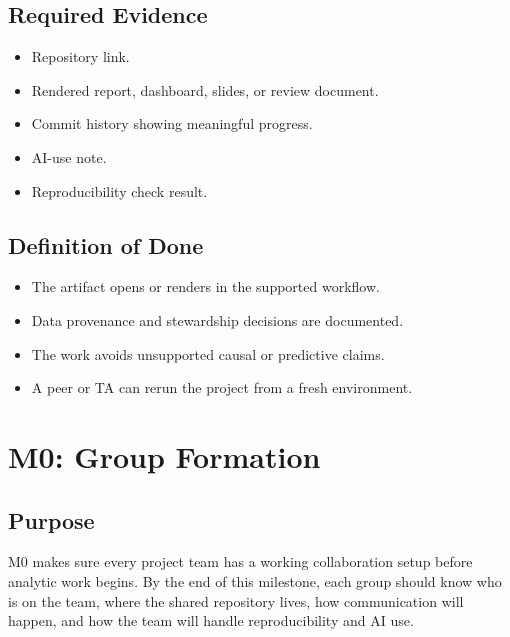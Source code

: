 \documentclass[
  letterpaper,
  DIV=11,
  numbers=noendperiod,
  oneside]{scrreprt}
\providecommand{\tightlist}{%
  \setlength{\itemsep}{0pt}\setlength{\parskip}{0pt}}
\begin{document}
\section*{Required Evidence}\label{required-evidence}


\begin{itemize}
\tightlist
\item
  Repository link.
\item
  Rendered report, dashboard, slides, or review document.
\item
  Commit history showing meaningful progress.
\item
  AI-use note.
\item
  Reproducibility check result.
\end{itemize}

\section*{Definition of Done}\label{definition-of-done-2}


\begin{itemize}
\tightlist
\item
  The artifact opens or renders in the supported workflow.
\item
  Data provenance and stewardship decisions are documented.
\item
  The work avoids unsupported causal or predictive claims.
\item
  A peer or TA can rerun the project from a fresh environment.
\end{itemize}

\chapter{M0: Group Formation}\label{m0-group-formation}

\section{Purpose}\label{purpose-1}

M0 makes sure every project team has a working collaboration setup
before analytic work begins. By the end of this milestone, each group
should know who is on the team, where the shared repository lives, how
communication will happen, and how the team will handle reproducibility
and AI use.
\end{document}
